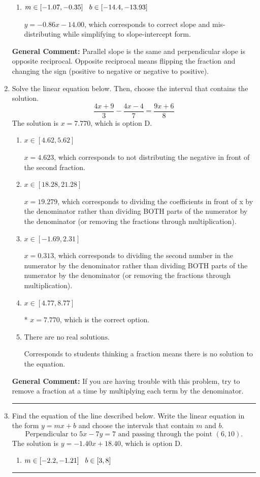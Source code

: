 \documentclass{extbook}[14pt]
\newcommand{\litem}[1]{\item #1

\rule{\textwidth}{0.4pt}}
\begin{document}
\begin{enumerate}
{\begin{enumerate}[label=\Alph*.]
 $y = -1.17x + 4.57$, which corresponds to using the reciprocal slope $(1/m)$.
\item \( m \in [-1.07, -0.35] \hspace*{3mm} b \in [-14.4, -13.93] \)

 $y = -0.86x - 14.00$, which corresponds to correct slope and mis-distributing while simplifying to slope-intercept form.
\end{enumerate}

\textbf{General Comment:} Parallel slope is the same and perpendicular slope is opposite reciprocal. Opposite reciprocal means flipping the fraction and changing the sign (positive to negative or negative to positive).
}
\litem{
Solve the linear equation below. Then, choose the interval that contains the solution.
\[ \frac{4x + 9}{3} - \frac{4x -4}{7} = \frac{9x + 6}{8} \]The solution is \( x = 7.770 \), which is option D.\begin{enumerate}[label=\Alph*.]
\item \( x \in [4.62, 5.62] \)

 $x = 4.623$, which corresponds to not distributing the negative in front of the second fraction.
\item \( x \in [18.28, 21.28] \)

 $x = 19.279$, which corresponds to dividing the coefficients in front of x by the denominator rather than dividing BOTH parts of the numerator by the denominator (or removing the fractions through multiplication).
\item \( x \in [-1.69, 2.31] \)

 $x = 0.313$, which corresponds to dividing the second number in the numerator by the denominator rather than dividing BOTH parts of the numerator by the denominator (or removing the fractions through multiplication).
\item \( x \in [4.77, 8.77] \)

* $x = 7.770$, which is the correct option.
\item \( \text{There are no real solutions.} \)

Corresponds to students thinking a fraction means there is no solution to the equation.
\end{enumerate}

\textbf{General Comment:} If you are having trouble with this problem, try to remove a fraction at a time by multiplying each term by the denominator.
}
\litem{
Find the equation of the line described below. Write the linear equation in the form $ y=mx+b $ and choose the intervals that contain $m$ and $b$.
\[ \text{Perpendicular to } 5 x - 7 y = 7 \text{ and passing through the point } (6, 10). \]The solution is \( y = -1.40x + 18.40 \), which is option D.\begin{enumerate}[label=\Alph*.]
\item \( m \in [-2.2, -1.21] \hspace*{3mm} b \in [3, 8] \)


\end{enumerate}}
\end{enumerate}
\end{document}
